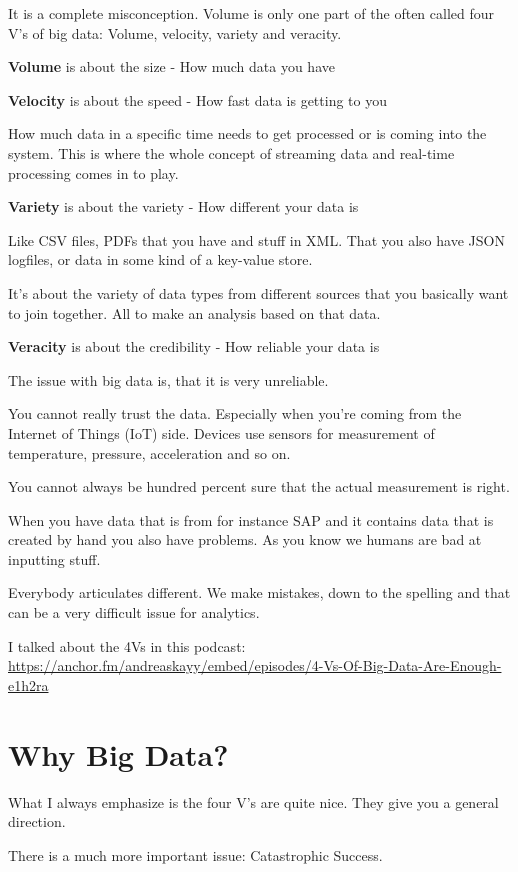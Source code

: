 \documentclass[12pt, numbers=noenddot]{scrreprt} %
\begin{document}
It is a complete misconception. Volume is only one part of the often called four V’s of big data: Volume, velocity, variety and veracity.

\textbf{Volume} is about the size - How much data you have

\textbf{Velocity} is about the speed - How fast data is getting to you

How much data in a specific time needs to get processed or is coming into the system. This is where the whole concept of streaming data and real-time processing comes in to play.

\textbf{Variety} is about the variety  - How different your data is

Like CSV files, PDFs that you have and stuff in XML. That you also have JSON logfiles, or data in some kind of a key-value store.

It’s about the variety of data types from different sources that you basically want to join together. All to make an analysis based on that data.

\textbf{Veracity} is about the credibility - How reliable your data is

The issue with big data is, that it is very unreliable.

You cannot really trust the data. Especially when you’re coming from the Internet of Things (IoT) side. Devices use sensors for measurement of temperature, pressure, acceleration and so on.

You cannot always be hundred percent sure that the actual measurement is right.

When you have data that is from for instance SAP and it contains data that is created by hand you also have problems. As you know we humans are bad at inputting stuff.

Everybody articulates different. We make mistakes, down to the spelling and that can be a very difficult issue for analytics.


I talked about the 4Vs in this podcast: \url{https://anchor.fm/andreaskayy/embed/episodes/4-Vs-Of-Big-Data-Are-Enough-e1h2ra}

\section{Why Big Data?}

What I always emphasize is the four V’s are quite nice. They give you a general direction.

There is a much more important issue: Catastrophic Success.
\end{document}
